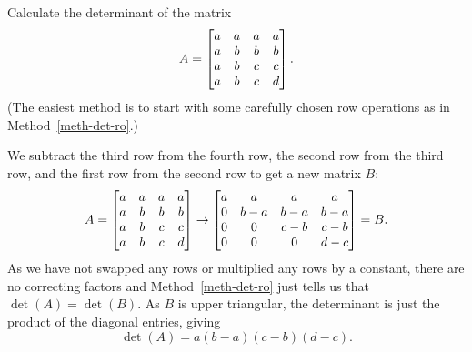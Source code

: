 \documentclass[a4paper]{amsart}
\renewenvironment{solution}{\SolutionInline}{\endSolutionInline}
\begin{document}
\begin{exercise}\label{ex-det-iii}
 Calculate the determinant of the matrix
 \[ 
  A = \left[\begin{matrix}
       a & a & a & a \\
       a & b & b & b \\
       a & b & c & c \\
       a & b & c & d 
      \end{matrix}\right].
 \]
 (The easiest method is to start with some carefully chosen row
 operations as in Method~\ref{meth-det-ro}.) 
\end{exercise}
\begin{solution}
 We subtract the third row from the fourth row, the second row from
 the third row, and the first row from the second row to get a new
 matrix $B$:
 \[ 
  A = \left[\begin{matrix}
       a & a & a & a \\
       a & b & b & b \\
       a & b & c & c \\
       a & b & c & d 
      \end{matrix}\right]
  \to 
      \left[\begin{matrix}
       a & a   & a   & a   \\
       0 & b-a & b-a & b-a \\
       0 & 0   & c-b & c-b \\
       0 & 0   & 0   & d-c 
      \end{matrix}\right]
  = B.
 \]
 As we have not swapped any rows or multiplied any rows by a constant,
 there are no correcting factors and Method~\ref{meth-det-ro} just
 tells us that $\det(A)=\det(B)$.  As $B$ is upper triangular, the
 determinant is just the product of the diagonal entries, giving
 \[ \det(A) = a(b-a)(c-b)(d-c). \]
\end{solution}
\end{document}
